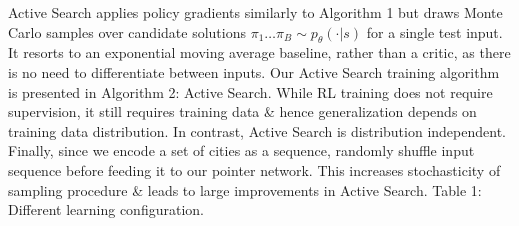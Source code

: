 \documentclass{article}
\begin{document}
\begin{itemize}
\begin{enumerate}
        Active Search applies policy gradients similarly to Algorithm 1 but draws Monte Carlo samples over candidate solutions $\pi_1\ldots\pi_B\sim p_\theta(\cdot|s)$ for a single test input. It resorts to an exponential moving average baseline, rather than a critic, as there is no need to differentiate between inputs. Our Active Search training algorithm is presented in {\sf Algorithm 2: Active Search}. While RL training does not require supervision, it still requires training data \& hence generalization depends on training data distribution. In contrast, Active Search is distribution independent. Finally, since we encode a set of cities as a sequence, randomly shuffle input sequence before feeding it to our pointer network. This increases stochasticity of sampling procedure \& leads to large improvements in Active Search. {\sf Table 1: Different learning configuration.}
        

\end{enumerate}
\end{itemize}
\end{document}
